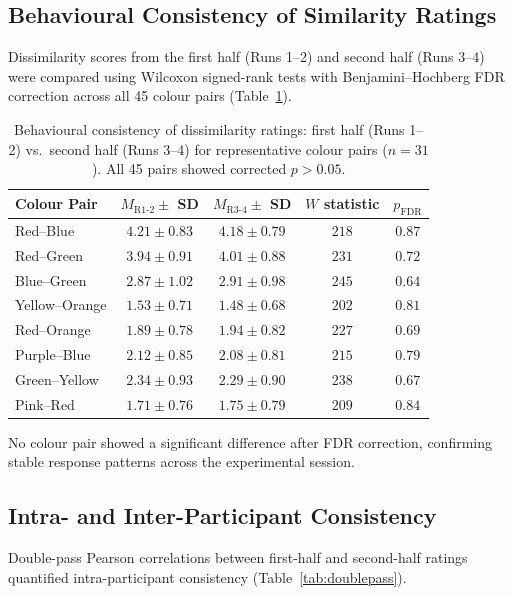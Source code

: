 \documentclass[11pt]{article}
\begin{document}
\subsection{Behavioural Consistency of Similarity Ratings}

Dissimilarity scores from the first half (Runs 1--2) and second half (Runs 3--4) were compared using Wilcoxon signed-rank tests \citep{wilcoxon1945individual} with Benjamini--Hochberg FDR correction \citep{benjamini1995controlling} across all 45 colour pairs (Table~\ref{tab:consistency}).

\begin{table}[H]
\centering
\caption{Behavioural consistency of dissimilarity ratings: first half (Runs 1--2) vs.\ second half (Runs 3--4) for representative colour pairs ($n = 31$). All 45 pairs showed corrected $p > 0.05$.}
\label{tab:consistency}
\begin{tabular}{lcccc}
\toprule
Colour Pair & $M_{\mathrm{R1\text{-}2}} \pm$ SD & $M_{\mathrm{R3\text{-}4}} \pm$ SD & $W$ statistic & $p_{\mathrm{FDR}}$ \\
\midrule
Red--Blue & $4.21 \pm 0.83$ & $4.18 \pm 0.79$ & $218$ & $0.87$ \\
Red--Green & $3.94 \pm 0.91$ & $4.01 \pm 0.88$ & $231$ & $0.72$ \\
Blue--Green & $2.87 \pm 1.02$ & $2.91 \pm 0.98$ & $245$ & $0.64$ \\
Yellow--Orange & $1.53 \pm 0.71$ & $1.48 \pm 0.68$ & $202$ & $0.81$ \\
Red--Orange & $1.89 \pm 0.78$ & $1.94 \pm 0.82$ & $227$ & $0.69$ \\
Purple--Blue & $2.12 \pm 0.85$ & $2.08 \pm 0.81$ & $215$ & $0.79$ \\
Green--Yellow & $2.34 \pm 0.93$ & $2.29 \pm 0.90$ & $238$ & $0.67$ \\
Pink--Red & $1.71 \pm 0.76$ & $1.75 \pm 0.79$ & $209$ & $0.84$ \\
\bottomrule
\end{tabular}
\end{table}

No colour pair showed a significant difference after FDR correction, confirming stable response patterns across the experimental session.

\subsection{Intra- and Inter-Participant Consistency}

Double-pass Pearson correlations between first-half and second-half ratings quantified intra-participant consistency (Table~\ref{tab:doublepass}).
\end{document}
